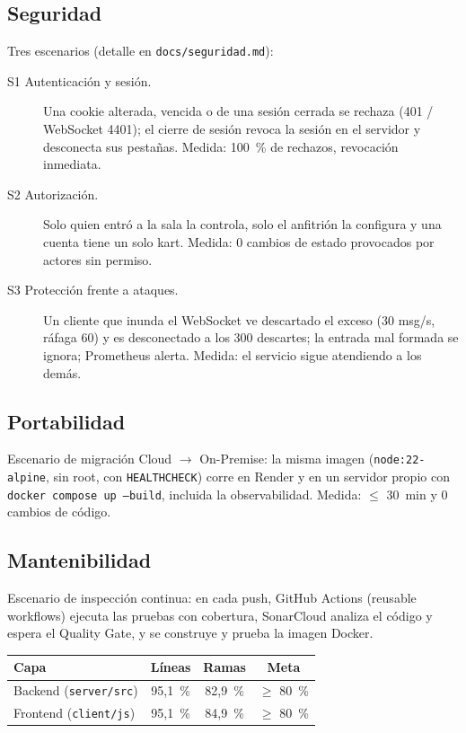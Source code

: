 \documentclass[11pt,a4paper]{article}
\begin{document}
\subsection{Seguridad}
Tres escenarios (detalle en \texttt{docs/seguridad.md}):
\begin{description}
  \item[S1 Autenticación y sesión.] Una cookie alterada, vencida o de una sesión cerrada se rechaza (401 / WebSocket 4401); el cierre de sesión revoca la sesión en el servidor y desconecta sus pestañas. Medida: 100~\% de rechazos, revocación inmediata.
  \item[S2 Autorización.] Solo quien entró a la sala la controla, solo el anfitrión la configura y una cuenta tiene un solo kart. Medida: 0 cambios de estado provocados por actores sin permiso.
  \item[S3 Protección frente a ataques.] Un cliente que inunda el WebSocket ve descartado el exceso (30 msg/s, ráfaga 60) y es desconectado a los 300 descartes; la entrada mal formada se ignora; Prometheus alerta. Medida: el servicio sigue atendiendo a los demás.
\end{description}

\subsection{Portabilidad}
Escenario de migración Cloud $\rightarrow$ On-Premise: la misma imagen
(\texttt{node:22-alpine}, sin root, con \texttt{HEALTHCHECK}) corre en Render
y en un servidor propio con \texttt{docker compose up --build}, incluida la
observabilidad. Medida: $\le$ 30~min y 0 cambios de código.

\subsection{Mantenibilidad}
Escenario de inspección continua: en cada push, GitHub Actions (reusable
workflows) ejecuta las pruebas con cobertura, SonarCloud analiza el código y
espera el Quality Gate, y se construye y prueba la imagen Docker.

\begin{center}
\begin{tabular}{lccc}
\toprule
Capa & Líneas & Ramas & Meta\\\midrule
Backend (\texttt{server/src}) & 95{,}1~\% & 82{,}9~\% & $\ge$ 80~\%\\
Frontend (\texttt{client/js}) & 95{,}1~\% & 84{,}9~\% & $\ge$ 80~\%\\
\bottomrule
\end{tabular}
\end{center}
\end{document}
